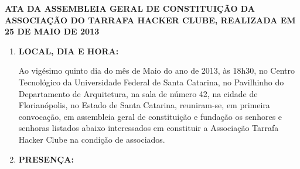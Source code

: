 \documentclass[a4paper]{report}
\begin{document}
\begin{center}
 \textbf{\MakeTextUppercase{Ata da Assembleia Geral de Constituição da
                            Associação do Tarrafa Hacker Clube,
                            realizada em 25 de Maio de 2013}}
\end{center}

\begin{enumerate}
\item \textbf{LOCAL, DIA E HORA:}

      Ao vigésimo quinto dia do mês de Maio do ano de 2013, às 18h30,
      no Centro Tecnológico da Universidade Federal de Santa Catarina,
      no Pavilhinho do Departamento de Arquitetura, na sala de número 42,
      na cidade de Florianópolis, no Estado de Santa Catarina,
      reuniram-se, em primeira convocação, em assembleia geral de constituição
      e fundação os senhores e senhoras listados abaixo interessados em
      constituir a Associação Tarrafa Hacker Clube na condição de associados.

\item \textbf{PRESENÇA:}


\end{enumerate}
\end{document}
